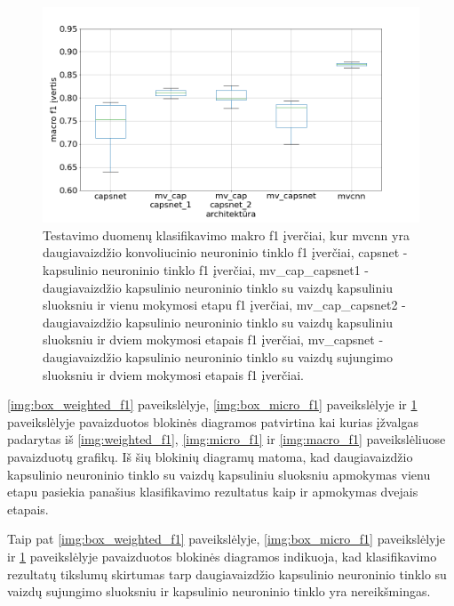 \begin{figure}[H]
	\centering
	\includegraphics[scale=0.5]{img/boxplot_f1_macro.png}
	\caption{
		Testavimo duomenų klasifikavimo makro f1 įverčiai, kur mvcnn yra daugiavaizdžio konvoliucinio neuroninio tinklo f1 įverčiai, capsnet - kapsulinio neuroninio tinklo f1 įverčiai, mv\_cap\_capsnet1 - daugiavaizdžio kapsulinio neuroninio tinklo su vaizdų kapsuliniu sluoksniu ir vienu mokymosi etapu f1 įverčiai, mv\_cap\_capsnet2 - daugiavaizdžio kapsulinio neuroninio tinklo su vaizdų kapsuliniu sluoksniu ir dviem mokymosi etapais f1 įverčiai,
		mv\_capsnet - daugiavaizdžio kapsulinio neuroninio tinklo su vaizdų sujungimo sluoksniu ir dviem mokymosi etapais f1 įverčiai.
	}
	\label{img:box_macro_f1}
\end{figure}


\ref{img:box_weighted_f1} paveikslėlyje, \ref{img:box_micro_f1} paveikslėlyje ir \ref{img:box_macro_f1} paveikslėlyje pavaizduotos blokinės diagramos patvirtina kai kurias įžvalgas padarytas iš \ref{img:weighted_f1}, \ref{img:micro_f1} ir \ref{img:macro_f1} paveikslėliuose pavaizduotų grafikų. Iš šių blokinių diagramų matoma, kad daugiavaizdžio kapsulinio neuroninio tinklo su vaizdų kapsuliniu sluoksniu apmokymas vienu etapu pasiekia panašius klasifikavimo rezultatus kaip ir apmokymas dvejais etapais.

Taip pat \ref{img:box_weighted_f1} paveikslėlyje, \ref{img:box_micro_f1} paveikslėlyje ir \ref{img:box_macro_f1} paveikslėlyje pavaizduotos blokinės diagramos indikuoja, kad klasifikavimo rezultatų tikslumų skirtumas tarp daugiavaizdžio kapsulinio neuroninio tinklo su vaizdų sujungimo sluoksniu ir kapsulinio neuroninio tinklo yra nereikšmingas.
